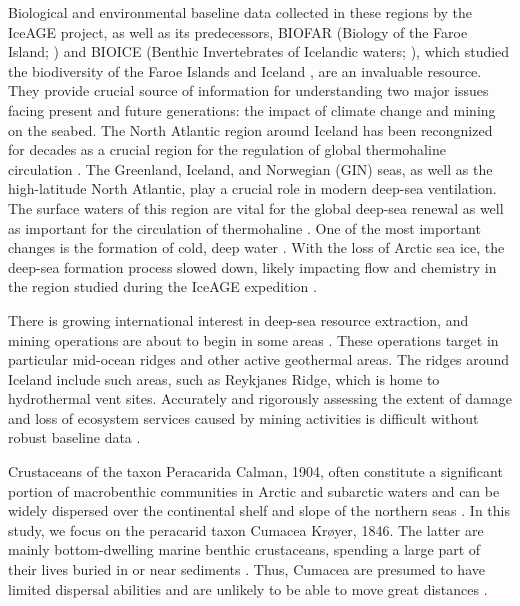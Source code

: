 Biological and environmental baseline data collected in these regions by the IceAGE project, as well as its predecessors, BIOFAR (Biology of the Faroe Island; \citep{gerken_cumacea_1999}) and BIOICE (Benthic Invertebrates of Icelandic waters; \citep{omarsdottir_biodiversity_2013}), which studied the biodiversity of the Faroe Islands and Iceland \citep{meisner_prefacebiodiversity_2018}, are an invaluable resource. They provide crucial source of information for understanding two major issues facing present and future generations: the impact of climate change and mining on the seabed. The North Atlantic region around Iceland has been recongnized for decades as a crucial region for the regulation of global thermohaline circulation \citep{meisner_prefacebiodiversity_2018}. The Greenland, Iceland, and Norwegian (GIN) seas, as well as the high-latitude North Atlantic, play a crucial role in modern deep-sea ventilation. The surface waters of this region are vital for the global deep-sea renewal as well as important for the circulation of thermohaline \citep{johannessen_relationship_1994}. One of the most important changes is the formation of cold, deep water \citep{meisner_prefacebiodiversity_2018}. With the loss of Arctic sea ice, the deep-sea formation process slowed down, likely impacting flow and chemistry in the region studied during the IceAGE expedition \citep{meisner_prefacebiodiversity_2018}.

There is growing international interest in deep-sea resource extraction, and mining operations are about to begin in some areas \citep{halfar_danger_2007, mengerink_call_2014}. These operations target in particular mid-ocean ridges and other active geothermal areas. The ridges around Iceland include such areas, such as Reykjanes Ridge, which is home to hydrothermal vent sites. Accurately and rigorously assessing the extent of damage and loss of ecosystem services caused by mining activities is difficult without robust baseline data \citep{meisner_prefacebiodiversity_2018}.

Crustaceans of the taxon Peracarida Calman, 1904, often constitute a significant portion of macrobenthic communities in Arctic and subarctic waters \citep{stransky_diversity_2010, uhlir_adding_2021} and can be widely dispersed over the continental shelf and slope of the northern seas \citep{brandt_species_1996, uhlir_adding_2021}. In this study, we focus on the peracarid taxon Cumacea Krøyer, 1846. The latter are mainly bottom-dwelling marine benthic crustaceans, spending a large part of their lives buried in or near sediments \citep{uhlir_adding_2021}. Thus, Cumacea are presumed to have limited dispersal abilities and are unlikely to be able to move great distances \citep{uhlir_adding_2021}.

